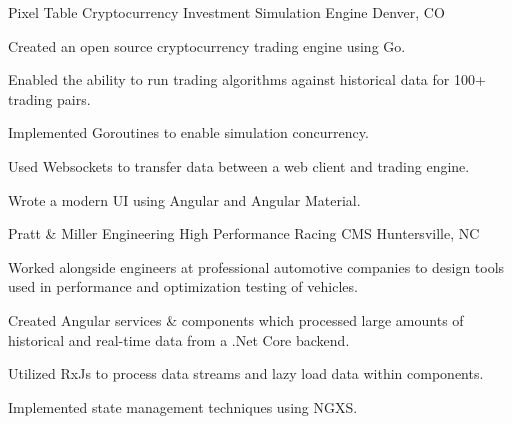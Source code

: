 

\begin{cventries}

    \cventry
    {Pixel Table} %
    {Cryptocurrency Investment Simulation Engine} %
    {Denver, CO} %
    {} %
    {
    \begin{cvitems} %
        \item {Created an open source cryptocurrency trading engine using Go.}
        \item {Enabled the ability to run trading algorithms against historical data for 100+ trading pairs.}
        \item {Implemented Goroutines to enable simulation concurrency.}
        \item {Used Websockets to transfer data between a web client and trading engine.}
        \item {Wrote a modern UI using Angular and Angular Material.}
    \end{cvitems}
    }

    \cventry
    {Pratt \& Miller Engineering} %
    {High Performance Racing CMS} %
    {Huntersville, NC} %
    {} %
    {
    \begin{cvitems} %
        \item {Worked alongside engineers at professional automotive companies to design tools used in performance and optimization testing of vehicles.}
        \item {Created Angular services \& components which processed large amounts of historical and real-time data from a .Net Core backend.}
        \item {Utilized RxJs to process data streams and lazy load data within components.}
        \item {Implemented state management techniques using NGXS.}
    \end{cvitems}
    }


\end{cventries}
